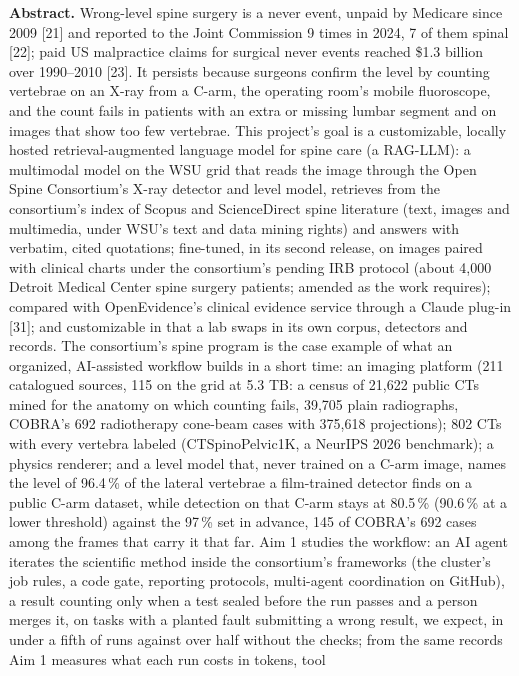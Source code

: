 \documentclass[10pt,letterpaper]{article}
\newcommand{\pct}{\,\%}
\begin{document}
\vspace{5pt}
{\small
{\bfseries Abstract.} Wrong-level spine surgery is a never event, unpaid by Medicare since 2009 [21] and reported to the
Joint Commission 9 times in 2024, 7 of them spinal [22]; paid US malpractice claims for surgical never events reached
\$1.3 billion over 1990--2010 [23]. It persists because surgeons confirm the level by counting vertebrae on an X-ray
from a C-arm, the operating room's mobile fluoroscope, and the count fails in patients with an extra or missing lumbar
segment and on images that show too few vertebrae. This project's goal is a customizable, locally hosted
retrieval-augmented language model for spine care (a RAG-LLM): a multimodal model on the WSU grid that reads the image through the Open Spine Consortium's X-ray detector and level model, retrieves from the consortium's index of Scopus
and ScienceDirect spine literature (text, images and multimedia, under WSU's text and data mining rights) and answers
with verbatim, cited quotations; fine-tuned, in its second release, on images paired with clinical charts under the consortium's pending IRB protocol (about 4,000 Detroit Medical Center spine surgery patients; amended as the work requires); compared with OpenEvidence's clinical evidence service through a Claude plug-in [31]; and customizable in that a lab swaps in its
own corpus, detectors and records. The consortium's spine program is the case example of what an organized,
AI-assisted workflow builds in a short time: an imaging platform (211 catalogued sources, 115 on the grid at 5.3 TB: a census of 21,622 public CTs mined for the anatomy on which counting fails, 39,705 plain radiographs,
COBRA's 692 radiotherapy cone-beam cases with 375,618 projections); 802 CTs with every vertebra labeled
(CTSpinoPelvic1K, a NeurIPS 2026 benchmark); a physics renderer; and a level model that, never trained on a C-arm
image, names the level of 96.4\pct{} of the lateral vertebrae a film-trained detector finds on a public C-arm dataset,
while detection on that C-arm stays at 80.5\pct{} (90.6\pct{} at a lower threshold) against the 97\pct{} set in
advance, 145 of COBRA's 692 cases among the frames that carry it that far. Aim 1 studies the workflow: an AI
agent iterates the scientific method inside the consortium's frameworks (the cluster's job rules, a code gate,
reporting protocols, multi-agent coordination on GitHub), a result counting only when a test sealed before the run
passes and a person merges it, on tasks with a planted fault submitting a wrong result, we expect, in under a fifth of
runs against over half without the checks; from the same records Aim 1 measures what each run costs in tokens, tool
}
\end{document}
